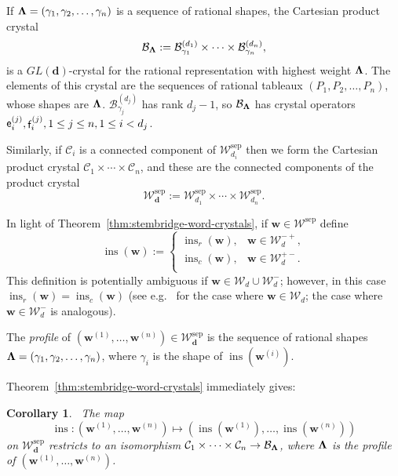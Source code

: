 \documentclass[12pt]{amsart}
\renewcommand{\d}{\mathbf{d}}
\newcommand{\bs}{\boldsymbol}
\DeclareMathOperator{\tabe}{{\sf e}}
\DeclareMathOperator{\tabf}{{\sf f}}
\DeclareMathOperator{\ins}{\operatorname{ins}}
\newtheorem{corollary}[theorem]{Corollary}
\theoremstyle{definition}
\theoremstyle{remark}
\begin{document}
If ${\bf \Lambda} = (\gamma_1, \gamma_2,\ldots,\gamma_n)$ is a sequence of rational shapes, the Cartesian product crystal
\[
\mathcal{B}_{\bf \Lambda} := \mathcal{B}^{(d_1)}_{\gamma_1}\times\cdots\times \mathcal{B}^{(d_n)}_{\gamma_n},
\]
is a $GL(\d)$-crystal for the rational representation with highest weight ${\bf \Lambda}$. The elements of this crystal are the sequences of rational tableaux $(P_1,P_2,\ldots,P_n)$, 
whose shapes are ${\bf \Lambda}$. $\mathcal{B}^{(d_j)}_{\gamma_j}$ has rank $d_j-1$, so $\mathcal{B}_{\bf \Lambda}$ has crystal operators $\tabe_i^{(j)}, \tabf_i^{(j)}, 1\leq j\leq n, 1\leq i < d_j$.

Similarly, if $\mathcal{C}_i$ is a connected component of 
${\mathcal W}_{d_i}^{\operatorname{sep}}$ then we form the Cartesian product crystal $\mathcal{C}_1\times\cdots\times\mathcal{C}_n$, and these are the connected components of the product crystal 
\[{\mathcal W}_{\d}^{\operatorname{sep}} 
:= {\mathcal W}_{d_1}^{\operatorname{sep}}\times\cdots\times {\mathcal W}_{d_n}^{\operatorname{sep}}.\] 

In light of Theorem~\ref{thm:stembridge-word-crystals}, if $\bs{w}\in {\mathcal W}^{\operatorname{sep}}$ define
\begin{equation}\label{eqn:July23aaa}
\ins(\bs{w}) := \begin{cases}
\ins_r(\bs{w}), &\bs{w}\in {\mathcal W}_d^{-+}, \\
\ins_c(\bs{w}), &\bs{w}\in {\mathcal W}_d^{+-}. \\
\end{cases}
\end{equation}
This definition is potentially ambiguous if $\bs{w}\in \mathcal{W}_d\cup\mathcal{W}_d^-$; however, in this case $\ins_r(\bs{w}) = \ins_c(\bs{w})$ (see e.g.~\cite[\S A.2]{Fulton-book} for the case where $\bs{w}\in \mathcal{W}_d$; the case where $\bs{w}\in \mathcal{W}_d^-$ is analogous).

The \emph{profile} of $({\bs w}^{(1)}, \ldots, {\bs w}^{(n)})\in
{\mathcal W}_{\d}^{\operatorname{sep}}$ is the sequence of
rational shapes ${\bf \Lambda} = (\gamma_1, \gamma_2,\ldots,\gamma_n)$, where $\gamma_i$ is the shape of $\ins({\bs w}^{(i)})$.

Theorem~\ref{thm:stembridge-word-crystals} immediately gives:
\begin{corollary} \label{cor:cart-prod-crystals} \ 
The map
\[
\ins: ({\bs w}^{(1)}, \ldots, {\bs w}^{(n)}) \mapsto (\ins({\bs w}^{(1)}), \ldots,\ins({\bs w}^{(n)}))
\]
on $\mathcal{W}_{\d}^{\operatorname{sep}}$ restricts to an isomorphism 
$\mathcal{C}_1\times\cdots\times\mathcal{C}_n\to \mathcal{B}_{\bf \Lambda}$, 
where ${\bf \Lambda} $ is the profile of $({\bs w}^{(1)}, \ldots, {\bs w}^{(n)})$.
\end{corollary}
\end{document}

